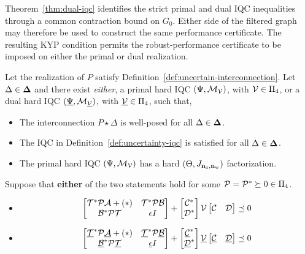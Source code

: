 Theorem~\ref{thm:dual-iqc} identifies the strict primal and dual IQC
inequalities through a common contraction bound on $G_0$. Either side of the
filtered graph may therefore be used to construct the same performance
certificate. The resulting
KYP condition permits the robust-performance certificate to be imposed on
either the primal or dual realization.
\begin{theorem}\label{thm:dual-KYP}
    Let the realization of $P$ satisfy Definition~\ref{def:uncertain-interconnection}. 
    Let $\Delta \in \mathbf{\Delta}$ and there exist \emph{either}, a primal hard IQC $(\Psi,\mathcal{M}_{\mathcal{V}})$,
    with $\mathcal{V}\in\Pi_4$, or a dual hard IQC $(\underline{\Psi},\mathcal{M}_{\underline{\mathcal{V}}})$,
    with $\underline{\mathcal{V}}\in\Pi_4$, such that,
    \begin{itemize}
        \item The interconnection $P\star\Delta$ is well-posed for all $\Delta\in\mathbf{\Delta}$.
        \item The IQC in Definition~\ref{def:uncertainty-iqc} is satisfied for all $\Delta\in\mathbf{\Delta}$.
        \item The primal hard IQC $(\Psi,\mathcal{M}_{\mathcal{V}})$ has a hard $(\Theta,J_{\mathbf{n}_{{\mathrm{z}}},\mathbf{n}_{{\mathrm{w}}}})$ factorization.
    \end{itemize}
    Suppose that \textbf{either} of the two statements hold for some $\mathcal{P} = \mathcal{P}^* \succeq 0 \in \Pi_4$.
    \begin{itemize}
        \item \begin{minipage}[c]{\linewidth}
        \begin{equation*}
            \begin{bmatrix}\mathcal{T}^*\mathcal{P}\mathcal{A} + (*) & \mathcal{T}^*\mathcal{P}\mathcal{B}\\
            \mathcal{B}^*\mathcal{P}\mathcal{T} & \epsilon I\end{bmatrix} + \begin{bmatrix}\mathcal{C}^* \\ \mathcal{D}^*\end{bmatrix}\mathcal{V}\begin{bmatrix}\mathcal{C} & \mathcal{D}\end{bmatrix} \preceq 0
        \end{equation*}
        \end{minipage}
        \item \begin{minipage}[c]{\linewidth}
        \begin{equation}\label{eq:dual-kyp}
            \bmat{\underline{\mcl T}^*\mcl P\underline{\mcl A} + (*)& \underline{\mcl T}^*\mcl P\underline{\mcl B}\\
            \underline{\mcl B}^*\mcl P\underline{\mcl T} & \underline{\epsilon} I} + \bmat{\underline{\mcl C}^* \\ \underline{\mcl D}^*}\underline{\mcl V}\bmat{\underline{\mcl C} & \underline{\mcl D}} \preceq 0

\end{equation}
\end{minipage}
\end{itemize}
\end{theorem}
